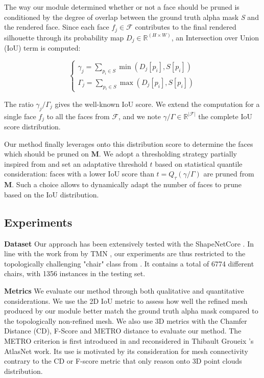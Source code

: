 The way our module determined whether or not a face should be pruned is conditioned by the degree of overlap between the ground truth alpha mask \textit{S} and the rendered face. Since each face $f_{j} \in \mathcal{F}$ contributes to the final rendered silhouette through its probability map $D_{j}\in \mathbb{R}^{(H\times W)}$, an Intersection over Union (IoU) term is computed: 

\begin{equation}
\begin{cases}
     \gamma_{j}=\sum_{p_{i}\in S} \min \left(  D_{j}[p_{i}] , S[p_{i}] \right) \\
     \Gamma_{j}=\sum_{p_{i}\in S} \max \left( D_{j}[p_{i}],S[p_{i}] \right)
\end{cases}
\end{equation}

The ratio $\gamma_{j}/\Gamma_{j}$ gives the well-known IoU score. We extend the computation for a single face $f_{j}$ to all the faces from $\mathcal{F}$, and we note $\gamma/\Gamma \in \mathbb{R}^{|\mathcal{F}|}$ the complete IoU score distribution.

Our method finally leverages onto this distribution score to determine the faces which should be pruned on $\mathbf{M}$. We adopt a thresholding strategy partially inspired from \citep{pan2019deep} and set an adaptative threshold $t$ based on statistical quantile consideration: faces with a lower IoU score than $t=Q_{\tau}(\gamma/\Gamma)$ are pruned from $\mathbf{M}$. Such a choice allows to dynamically adapt the number of faces to prune based on the IoU distribution. 

\subsection{Experiments}
\label{sec:experiments}

\textbf{Dataset} Our approach has been extensively tested with the ShapeNetCore \citep{chang2015shapenet}. In line with the work from by TMN \citep{pan2019deep}, our experiments are thus restricted to the topologically challenging "chair" class from \citep{chang2015shapenet}. It contains a total of 6774 different chairs, with 1356 instances in the testing set.

\noindent\textbf{Metrics} We evaluate our method through both qualitative and quantitative considerations. We use the 2D IoU metric to assess how well the refined mesh produced by our module better match the ground truth alpha mask compared to the topologically non-refined mesh. We also use 3D metrics with the Chamfer Distance (CD), F-Score and METRO distance to evaluate our method. The METRO criterion is first introduced in \citep{cignoni1998metro} and reconsidered in Thibault Groueix \etal 's AtlasNet \citep{groueix2018papier} work. Its use is motivated by its consideration for mesh connectivity contrary to the CD or F-score metric that only reason onto 3D point clouds distribution. 


